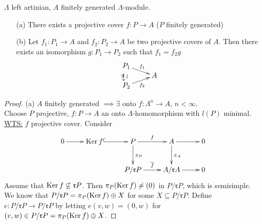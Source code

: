 \begin{thm}
\label{thm:proj-cov_unique}
$\Lambda$ left artinian, $A$ finitely generated $\Lambda$-module.
\begin{enumerate}
\item[(a)] There exists a projective cover $f\colon P\to A$ ($P$ finitely generated)
\item[(b)] Let $f_1 \colon  P_1 \to A$ and $f_2 \colon  P_2 \to A$ be two projective covers of $A$. Then there exists an isomorphism $g \colon  P_1 \to P_2$ such that $f_1 = f_2g$
\[
\xymatrix@R-2pc{
P_1\ar@{}[dd]_g|-*[@]{\xrightarrow{\sim}} \ar[dr]^{f_1}\\
& A\\
P_2 \ar[ur]_{f_2}
}
\]
\end{enumerate}

\begin{proof}
(a) $A$ finitely generated $\implies \exists$ onto $f\colon  \Lambda^n \to A$, $n < \infty$.\\
Choose $P$ projective, $f \colon  P \to A$ an onto $\Lambda$-homomorphism
with $l(P)$ minimal. \underline{WTS:} $f$ projective cover. Consider 
\[
\xymatrix{
0\ar[r] & \Ker f \ar@{^{(}->}[r]  & P \ar[r]^f \ar[d]^{\pi_P} & A \ar[r] \ar[d]^{\pi_A} & 0\\
  &        & P/\mathfrak{r}P \ar[r]^{\overline{f}} & A/\mathfrak{r}A \ar[r] & 0
}
\]
Assume that $\operatorname{Ker}\nolimits f \not\subseteq \mathfrak{r}P$. Then $\pi_P(\operatorname{Ker}\nolimits f)
\neq (0)$ in $P/\mathfrak{r}P$, which is semisimple. We know that 
$ P/\mathfrak{r}P = \pi_P(\operatorname{Ker}\nolimits f) \oplus X $
for some $X \subseteq P/\mathfrak{r}P$. 
Define $e \colon  P/\mathfrak{r}P \to P/\mathfrak{r}P$ by letting $e(v, w) =
(0, w)$ for $(v, w) \in P/\mathfrak{r}P = \pi_P(\operatorname{Ker}\nolimits f) \oplus X$. 


\end{proof}
\end{thm}

